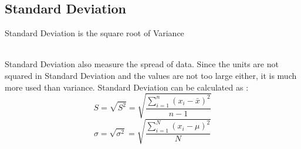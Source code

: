 \documentclass[twoside,12pt]{report}  %
\begin{document}
\subsection{Standard Deviation}
\begin{tcolorbox}[colback=red!5!white, colframe=red!75!black, title = \textbf{Standard Deviation}]
	Standard Deviation is the square root of Variance
\end{tcolorbox}
\noindent
\\
Standard Deviation also measure the spread of data. Since the units are not squared in Standard Deviation and the values are not too large either, it is much more used than variance.
Standard Deviation can be calculated as : 
$$ \boxed{S = \sqrt{S^2} = \sqrt{\frac{\sum_{i=1}^{n} ( x_i - \bar{x} )^2} {n - 1}}} $$
$$ \boxed{\sigma = \sqrt{\sigma^2} = \sqrt{\frac{\sum_{i=1}^{N} (x_i - \mu)^2} {N}}} $$
\end{document}
